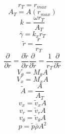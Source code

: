  \[r_T = r_{max}\]
 \[A_T = A(r_{max})\]
 \[k = \frac{\omega r_T}{A_T}\]
 \[\bar{\gamma} = k_x r_T\]
 \[\tilde{r} = \frac{r}{r_T}\]
 \[\frac{\partial }{\partial r} = \frac{\partial \tilde{r}}{\partial r} \frac{\partial }{\partial \tilde{r}} = \frac{1}{r_T} \frac{\partial }{\partial \tilde{r}}\]
 \[V_{\theta} = M_{\theta} A\]
 \[V_{x} = M_{x} A\]
 \[\tilde{A} = \frac{A}{A_T}\]
 \[v_{x} =\tilde{v}_x A\]
 \[v_{r} =\tilde{v}_r A\]
 \[v_{\theta} =\tilde{v}_{\theta} A\]
 \[p = \tilde{p} \bar{\rho} A^2\]

%




